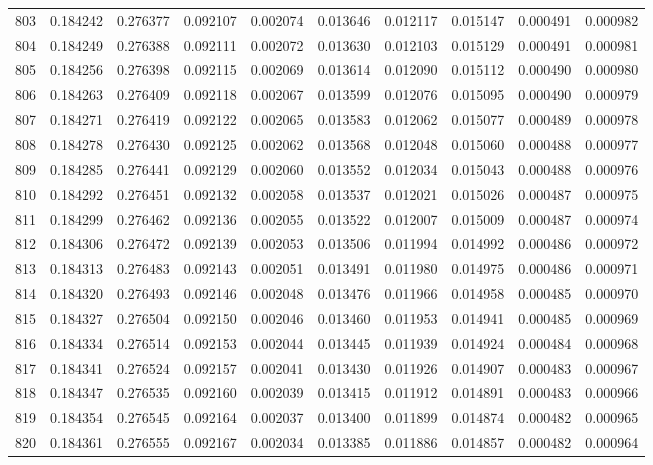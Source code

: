 \begin{tabular}{lrrrrrrrrr}
803 & 0.184242 & 0.276377 & 0.092107 & 0.002074 & 0.013646 & 0.012117 & 0.015147 & 0.000491 & 0.000982 \\
804 & 0.184249 & 0.276388 & 0.092111 & 0.002072 & 0.013630 & 0.012103 & 0.015129 & 0.000491 & 0.000981 \\
805 & 0.184256 & 0.276398 & 0.092115 & 0.002069 & 0.013614 & 0.012090 & 0.015112 & 0.000490 & 0.000980 \\
806 & 0.184263 & 0.276409 & 0.092118 & 0.002067 & 0.013599 & 0.012076 & 0.015095 & 0.000490 & 0.000979 \\
807 & 0.184271 & 0.276419 & 0.092122 & 0.002065 & 0.013583 & 0.012062 & 0.015077 & 0.000489 & 0.000978 \\
808 & 0.184278 & 0.276430 & 0.092125 & 0.002062 & 0.013568 & 0.012048 & 0.015060 & 0.000488 & 0.000977 \\
809 & 0.184285 & 0.276441 & 0.092129 & 0.002060 & 0.013552 & 0.012034 & 0.015043 & 0.000488 & 0.000976 \\
810 & 0.184292 & 0.276451 & 0.092132 & 0.002058 & 0.013537 & 0.012021 & 0.015026 & 0.000487 & 0.000975 \\
811 & 0.184299 & 0.276462 & 0.092136 & 0.002055 & 0.013522 & 0.012007 & 0.015009 & 0.000487 & 0.000974 \\
812 & 0.184306 & 0.276472 & 0.092139 & 0.002053 & 0.013506 & 0.011994 & 0.014992 & 0.000486 & 0.000972 \\
813 & 0.184313 & 0.276483 & 0.092143 & 0.002051 & 0.013491 & 0.011980 & 0.014975 & 0.000486 & 0.000971 \\
814 & 0.184320 & 0.276493 & 0.092146 & 0.002048 & 0.013476 & 0.011966 & 0.014958 & 0.000485 & 0.000970 \\
815 & 0.184327 & 0.276504 & 0.092150 & 0.002046 & 0.013460 & 0.011953 & 0.014941 & 0.000485 & 0.000969 \\
816 & 0.184334 & 0.276514 & 0.092153 & 0.002044 & 0.013445 & 0.011939 & 0.014924 & 0.000484 & 0.000968 \\
817 & 0.184341 & 0.276524 & 0.092157 & 0.002041 & 0.013430 & 0.011926 & 0.014907 & 0.000483 & 0.000967 \\
818 & 0.184347 & 0.276535 & 0.092160 & 0.002039 & 0.013415 & 0.011912 & 0.014891 & 0.000483 & 0.000966 \\
819 & 0.184354 & 0.276545 & 0.092164 & 0.002037 & 0.013400 & 0.011899 & 0.014874 & 0.000482 & 0.000965 \\
820 & 0.184361 & 0.276555 & 0.092167 & 0.002034 & 0.013385 & 0.011886 & 0.014857 & 0.000482 & 0.000964 \\

\end{tabular}
